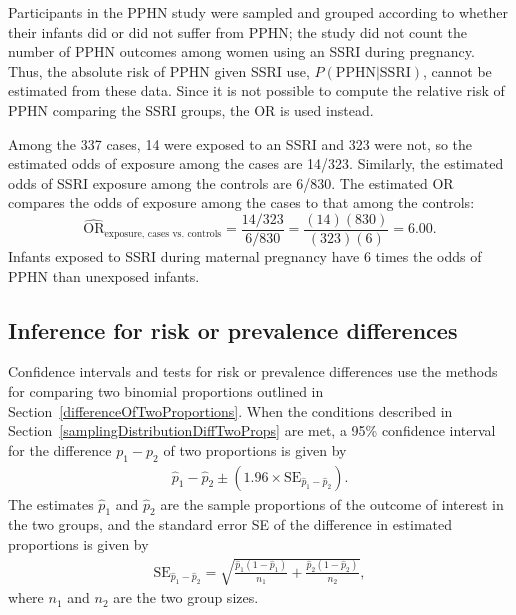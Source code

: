 Participants in the PPHN study were sampled and grouped according to whether their infants did or did not suffer from PPHN; the study did not count the number of PPHN outcomes among women using an SSRI during pregnancy. Thus, the absolute risk of PPHN given SSRI use, $P(\text{PPHN} | \text{SSRI})$, cannot be estimated from these data.  Since it is not possible to compute the relative risk of PPHN comparing the SSRI groups, the OR is used instead.

Among the 337 cases, 14 were exposed to an SSRI and 323 were not, so the estimated odds of exposure among the cases are 14/323.  Similarly, the estimated odds of SSRI exposure among the controls are 6/830. The estimated OR compares the odds of exposure among the cases to that among the controls:
\[
\widehat{\text{OR}}_{\text{exposure, cases vs. controls}} =  \frac{14/323}{6/830} = \frac{(14)(830)}{(323)(6)} =  6.00.
\]
Infants exposed to SSRI during maternal pregnancy have 6 times the odds of PPHN than unexposed infants.

\subsection{Inference for risk or prevalence differences}
\label{inferenceRiskDifference}

Confidence intervals and tests for risk or prevalence differences use the methods for comparing two binomial proportions outlined in Section~\ref{differenceOfTwoProportions}. When the conditions described in Section~\ref{samplingDistributionDiffTwoProps} are met, a 95\% confidence interval for the difference $p_1 - p_2$ of two proportions is given by
\begin{align*}
  \hat{p}_1 - \hat{p}_2 \pm ( 1.96 \times \text{SE}_{\hat{p}_1 - \hat{p}_2}).
\end{align*}
The estimates $\hat{p}_1$ and $\hat{p}_2$ are the sample proportions of the outcome of interest in the two groups, and the standard error SE of the difference in estimated proportions is given by
\begin{align*}
  \text{SE}_{\hat{p}_1 - \hat{p}_2}
= \sqrt{\frac{\hat{p}_1(1-\hat{p}_1)}{n_1} + \frac{\hat{p}_2(1-\hat{p}_2)}{n_2}},
\end{align*}
where $n_1$ and $n_2$ are the two group sizes.

